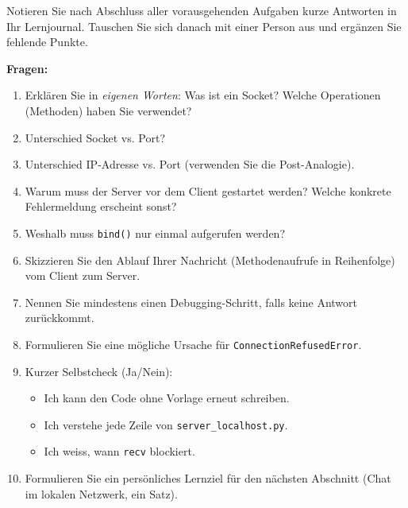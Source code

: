 \begin{myexercise}[Reflexionsfragen]
    Notieren Sie nach Abschluss aller vorausgehenden Aufgaben kurze Antworten in Ihr Lernjournal. Tauschen Sie sich danach mit einer Person aus und ergänzen Sie fehlende Punkte.

    \textbf{Fragen:}
    \begin{enumerate}
        \item Erklären Sie in \emph{eigenen Worten}: Was ist ein Socket? Welche Operationen (Methoden) haben Sie verwendet?
        \item Unterschied Socket vs. Port?
        \item Unterschied \gls{IP}-Adresse vs. Port (verwenden Sie die Post-Analogie).
        \item Warum muss der Server vor dem Client gestartet werden? Welche konkrete Fehlermeldung erscheint sonst?
        \item Weshalb muss \lstinline|bind()| nur einmal aufgerufen werden?
        \item Skizzieren Sie den Ablauf Ihrer Nachricht (Methodenaufrufe in Reihenfolge) vom Client zum Server.
        \item Nennen Sie mindestens einen Debugging-Schritt, falls keine Antwort zurückkommt.
        \item Formulieren Sie eine mögliche Ursache für \texttt{ConnectionRefusedError}.
        \item Kurzer Selbstcheck (Ja/Nein):
              \begin{itemize}
                  \item Ich kann den Code ohne Vorlage erneut schreiben.
                  \item Ich verstehe jede Zeile von \texttt{server\_localhost.py}.
                  \item Ich weiss, wann \texttt{recv} blockiert.
              \end{itemize}
        \item Formulieren Sie ein persönliches Lernziel für den nächsten Abschnitt (Chat im lokalen Netzwerk, ein Satz).
    \end{enumerate}


\end{myexercise}
